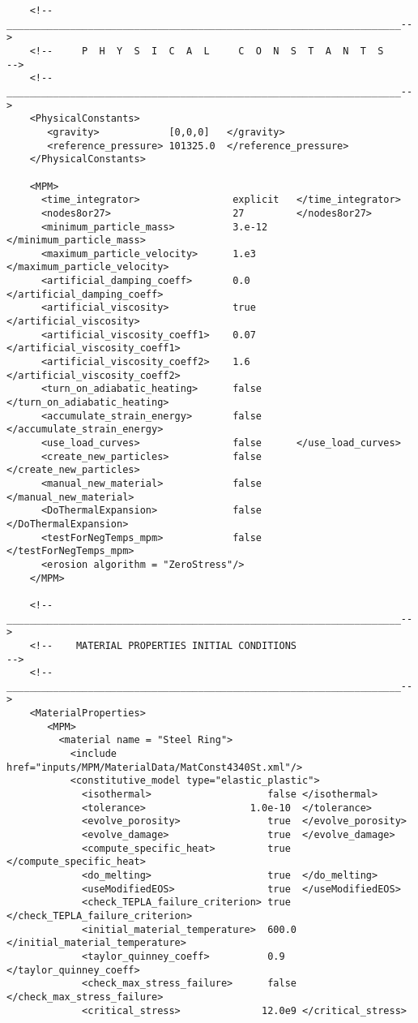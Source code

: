 \begin{lstlisting}
    <!--____________________________________________________________________-->
    <!--     P  H  Y  S  I  C  A  L     C  O  N  S  T  A  N  T  S           -->
    <!--____________________________________________________________________-->   
    <PhysicalConstants>
       <gravity>            [0,0,0]   </gravity>
       <reference_pressure> 101325.0  </reference_pressure>
    </PhysicalConstants>

    <MPM>
      <time_integrator>                explicit   </time_integrator>
      <nodes8or27>                     27         </nodes8or27>
      <minimum_particle_mass>          3.e-12     </minimum_particle_mass>
      <maximum_particle_velocity>      1.e3       </maximum_particle_velocity>
      <artificial_damping_coeff>       0.0        </artificial_damping_coeff>
      <artificial_viscosity>           true       </artificial_viscosity>
      <artificial_viscosity_coeff1>    0.07       </artificial_viscosity_coeff1>
      <artificial_viscosity_coeff2>    1.6        </artificial_viscosity_coeff2>
      <turn_on_adiabatic_heating>      false      </turn_on_adiabatic_heating>
      <accumulate_strain_energy>       false      </accumulate_strain_energy>
      <use_load_curves>                false      </use_load_curves>
      <create_new_particles>           false      </create_new_particles>
      <manual_new_material>            false      </manual_new_material>
      <DoThermalExpansion>             false      </DoThermalExpansion>
      <testForNegTemps_mpm>            false      </testForNegTemps_mpm>
      <erosion algorithm = "ZeroStress"/>
    </MPM>

    <!--____________________________________________________________________-->
    <!--    MATERIAL PROPERTIES INITIAL CONDITIONS                          -->
    <!--____________________________________________________________________-->
    <MaterialProperties>
       <MPM>
         <material name = "Steel Ring">
           <include href="inputs/MPM/MaterialData/MatConst4340St.xml"/>
           <constitutive_model type="elastic_plastic">
             <isothermal>                    false </isothermal>
             <tolerance>                  1.0e-10  </tolerance>
             <evolve_porosity>               true  </evolve_porosity>
             <evolve_damage>                 true  </evolve_damage>
             <compute_specific_heat>         true  </compute_specific_heat>
             <do_melting>                    true  </do_melting>
             <useModifiedEOS>                true  </useModifiedEOS>
             <check_TEPLA_failure_criterion> true  </check_TEPLA_failure_criterion>
             <initial_material_temperature>  600.0 </initial_material_temperature>
             <taylor_quinney_coeff>          0.9   </taylor_quinney_coeff>
             <check_max_stress_failure>      false </check_max_stress_failure>
             <critical_stress>              12.0e9 </critical_stress>


\end{lstlisting}
